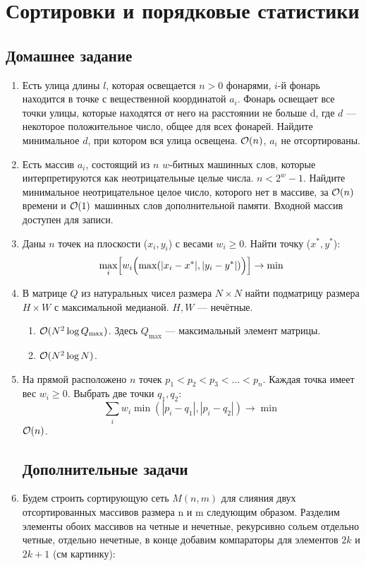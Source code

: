 \section{Сортировки и порядковые статистики}
\subsection{Домашнее задание}
\begin{enumerate}
  \item
    Есть улица длины $l$, которая освещается $n > 0$ фонарями, $i$-й фонарь находится в
    точке с вещественной координатой $a_i$. Фонарь освещает все точки улицы, которые находятся от него на
    расстоянии не больше d, где $d$ — некоторое положительное число, общее для всех фонарей.
    Найдите минимальное $d$, при котором вся улица освещена. $\mathcal{O}(n)$, $a_i$ не отсортированы.

  \item
    Есть массив $a_i$, состоящий из $n$ $w$-битных машинных слов, которые интерпретируются как неотрицательные целые числа. $n < 2^{w} - 1$.
    Найдите минимальное неотрицательное целое число, которого нет в массиве, за $\mathcal{O}(n)$ времени и $\mathcal{O}(1)$ машинных слов дополнительной памяти.
    Входной массив доступен для записи.

  \item
    Даны $n$ точек на плоскости ($x_i, y_i$) с весами $w_i \ge 0$. Найти точку ($x^{*}, y^{*}$):
    $$\max\limits_i \Bigl[ w_i\Bigl(\max(|x_i-x^{*}|, |y_i-y^{*}|)\Bigl) \Bigr] \rightarrow \min$$

  \item
    В матрице $Q$ из натуральных чисел размера $N \times N$ найти подматрицу размера $H \times W$
    с максимальной медианой. $H, W$ --- нечётные.
    \begin{enumerate}
      \item $\mathcal{O}(N^2 \log{Q_{\max}})$. Здесь $Q_{\max}$ --- максимальный элемент матрицы.
      \item $\mathcal{O}(N^2 \log{N})$.
    \end{enumerate}

  \item
    На прямой расположено $n$ точек $p_1 < p_2 < p_3 < \dots < p_n$. Каждая точка имеет вес $w_i \ge 0$.
    Выбрать две точки $q_1, q_2$: $$\sum\limits_i w_i \min(|p_i - q_1|,|p_i - q_2|) \rightarrow \min$$
    $\mathcal{O}(n)$.

\subsection*{Дополнительные задачи}
  \item
    Будем строить сортирующую сеть $M(n,m)$ для слияния двух отсортированных массивов
    размера n и m следующим образом. Разделим элементы обоих массивов на четные и
    нечетные, рекурсивно сольем отдельно четные, отдельно нечетные, в конце добавим
    компараторы для элементов $2k$ и $2k + 1$ (см картинку):


\end{enumerate}
